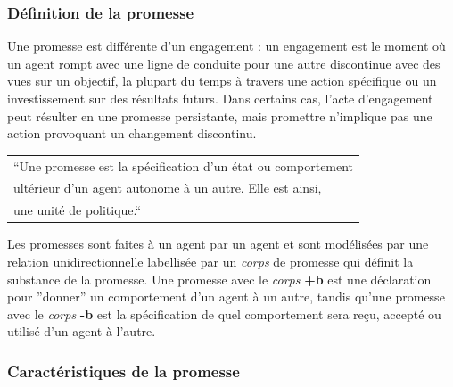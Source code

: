 
\subsubsection{Définition de la promesse}

Une promesse est différente d'un engagement : un engagement est le moment où un
agent rompt avec une ligne de conduite pour une autre discontinue avec des vues
sur un objectif, la plupart du temps à travers une action spécifique ou un
investissement sur des résultats futurs. Dans certains cas, l'acte
d'engagement peut résulter en une promesse persistante, mais promettre
n'implique pas une action provoquant un changement discontinu.

{%
    \centering
    \begin{tabular}{l}
        ``Une promesse est la spécification d'un état ou comportement \\
        ultérieur d'un agent autonome à un autre. Elle est ainsi, \\
        une unité de politique.`` \cite{burgess_modeling_2006} \\
    \end{tabular}
}%

Les promesses sont faites à un agent par un agent et sont modélisées par une
relation unidirectionnelle labellisée par un \emph{corps} de promesse qui
définit la substance de la promesse. Une promesse avec le \emph{corps}
\textbf{+b} est une déclaration pour ''donner'' un comportement d'un agent à un
autre, tandis qu'une promesse avec le \emph{corps} \textbf{-b} est la
spécification de quel comportement sera reçu, accepté ou utilisé d'un agent à
l'autre.

\subsubsection{Caractéristiques de la promesse}

